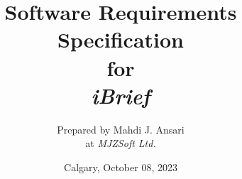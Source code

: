 
\def\Company{\textit{MJZSoft Ltd.}}
\def\Institute{\textit{Fontys Hogeschool Techniek en Logistiek, Venlo}}
\def\Authors{Prepared by Mahdi J. Ansari }

\def\BoldTitle{Software Requirements Specification}
\def\Subtitle{for \\ \textit{iBrief} \\}


\title{\textbf{\BoldTitle}\\\Subtitle}
\author{\Authors \\ at \Company\\}
\date{Calgary, October 08, 2023}

